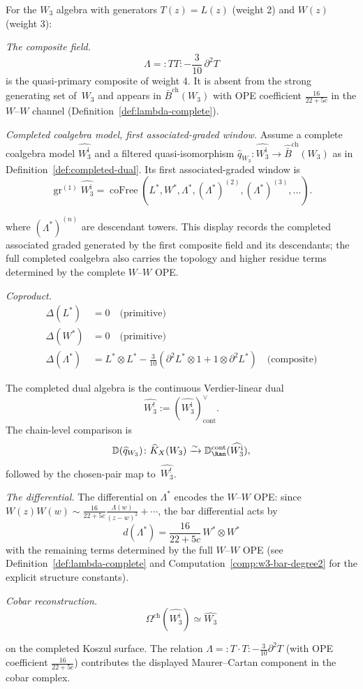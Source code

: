 \begin{example}\label{ex:W-completion}
For the $W_3$ algebra with generators $T(z) = L(z)$ (weight 2) and $W(z)$ (weight 3):

\emph{The composite field.}
\[\Lambda = {:}TT{:} - \frac{3}{10}\,\partial^2 T\]
is the quasi-primary composite of weight 4. It is absent from the
strong generating set of~$W_3$ and appears in
$\bar{B}^{\mathrm{ch}}(W_3)$ with OPE coefficient
$\frac{16}{22+5c}$ in the $W$--$W$ channel
(Definition~\ref{def:lambda-complete}).

\emph{Completed coalgebra model, first associated-graded window.}
Assume a complete coalgebra model
$\widehat{W_3^{\mathrm i}}$ and a filtered quasi-isomorphism
$\widehat q_{W_3}\colon\widehat{W_3^{\mathrm i}}\to
\widehat{\bar B}^{\mathrm{ch}}(W_3)$ as in
Definition~\ref{def:completed-dual}.  Its first associated-graded
window is
\[
\operatorname{gr}^{(1)}\widehat{W_3^{\mathrm i}}
=\operatorname{coFree}(L^*,W^*,\Lambda^*,
(\Lambda^*)^{(2)},(\Lambda^*)^{(3)},\ldots).
\]

where $(\Lambda^*)^{(n)}$ are descendant towers. This display records
the completed associated graded generated by the first composite
field and its descendants; the full completed coalgebra also carries
the topology and higher residue terms determined by the complete
$W$--$W$ OPE.

\emph{Coproduct.}
\begin{align*}
\Delta(L^*) &= 0 \quad \text{(primitive)}\\
\Delta(W^*) &= 0 \quad \text{(primitive)}\\
\Delta(\Lambda^*) &= L^* \otimes L^* - \frac{3}{10}\left(\partial^2 L^* \otimes 1 + 1 \otimes \partial^2 L^*\right) \quad \text{(composite)}
\end{align*}

The completed dual algebra is the continuous Verdier-linear dual
\[
\widehat{W_3^!}:=(\widehat{W_3^{\mathrm i}})^\vee_{\mathrm{cont}}.
\]
The chain-level comparison is
\[
\mathbb D(\widehat q_{W_3})\colon
\widehat K_X(W_3)\xrightarrow{\sim}
\mathbb D^{\mathrm{cont}}_{\Ran}(\widehat{W_3^{\mathrm i}}),
\]
followed by the chosen-pair map to~$\widehat{W_3^!}$.

\emph{The differential.}
The differential on $\Lambda^*$ encodes the $W$--$W$ OPE:
since $W(z)W(w) \sim \frac{16}{22+5c}\frac{\Lambda(w)}{(z-w)^2} + \cdots$, the bar differential acts by
\[d(\Lambda^*) = \frac{16}{22+5c}\, W^* \otimes W^*\]
with the remaining terms determined by the full $W$--$W$ OPE (see Definition~\ref{def:lambda-complete} and Computation~\ref{comp:w3-bar-degree2} for the explicit structure constants).

\emph{Cobar reconstruction.}
\[\Omega^{\text{ch}}(\widehat{W_3^{\mathrm i}})
\simeq \widehat{W_3}\]

on the completed Koszul surface. The relation
$\Lambda = :T \cdot T: - \frac{3}{10}\partial^2 T$ (with OPE
coefficient $\frac{16}{22+5c}$) contributes the displayed
Maurer--Cartan component in the cobar complex.
\end{example}

